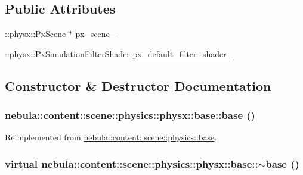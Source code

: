 \subsection*{Public Attributes}
\begin{DoxyCompactItemize}
\item 
::physx::PxScene $\ast$ \hyperlink{classnebula_1_1content_1_1scene_1_1physics_1_1physx_1_1base_a54c9415d4951ca7702e6e29c3d5016bc}{px\_\-scene\_\-}
\item 
::physx::PxSimulationFilterShader \hyperlink{classnebula_1_1content_1_1scene_1_1physics_1_1physx_1_1base_a414181f67b4979fe773c49aa6a71feb4}{px\_\-default\_\-filter\_\-shader\_\-}
\end{DoxyCompactItemize}


\subsection{Constructor \& Destructor Documentation}
\hypertarget{classnebula_1_1content_1_1scene_1_1physics_1_1physx_1_1base_a7836f85b5d614cda501a7bf327dbf7d4}{
\subsubsection[{base}]{\setlength{\rightskip}{0pt plus 5cm}nebula::content::scene::physics::physx::base::base ()}}
\label{classnebula_1_1content_1_1scene_1_1physics_1_1physx_1_1base_a7836f85b5d614cda501a7bf327dbf7d4}


Reimplemented from \hyperlink{classnebula_1_1content_1_1scene_1_1physics_1_1base_a1e07f80c04a9066a6a61bad3e8f5353b}{nebula::content::scene::physics::base}.\hypertarget{classnebula_1_1content_1_1scene_1_1physics_1_1physx_1_1base_a30bdf071f30320b0408989d9735d5f17}{
\subsubsection[{$\sim$base}]{\setlength{\rightskip}{0pt plus 5cm}virtual nebula::content::scene::physics::physx::base::$\sim$base ()}}
\label{classnebula_1_1content_1_1scene_1_1physics_1_1physx_1_1base_a30bdf071f30320b0408989d9735d5f17}


